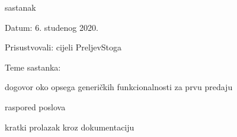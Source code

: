 \begin{packed_enum}
			\item  sastanak
			\item[] \begin{packed_item}
				\item Datum: 6. studenog 2020.
				\item Prisustvovali: cijeli PreljevStoga
				\item Teme sastanka:
				\begin{packed_item}
					\item  dogovor oko opsega generičkih funkcionalnosti za prvu predaju
					\item  raspored poslova
					\item  kratki prolazak kroz dokumentaciju
				\end{packed_item}
			\end{packed_item}
			
			
		\end{packed_enum}
		
		\eject
